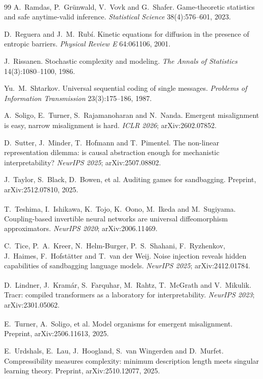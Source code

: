 \documentclass[11pt,a4paper]{article}
\newcommand{\unv}{\textsuperscript{\dag}}
\begin{document}
\begin{thebibliography}{99}
\unv{} A.~Ramdas, P.~Gr\"unwald, V.~Vovk and G.~Shafer.
Game-theoretic statistics and safe anytime-valid inference.
\emph{Statistical Science} 38(4):576--601, 2023.

 D.~Reguera and J.~M.~Rub\'i. Kinetic equations for
diffusion in the presence of entropic barriers. \emph{Physical Review E}
64:061106, 2001.

 J.~Rissanen. Stochastic complexity and modeling.
\emph{The Annals of Statistics} 14(3):1080--1100, 1986.

 Yu.~M.~Shtarkov. Universal sequential coding of
single messages. \emph{Problems of Information Transmission}
23(3):175--186, 1987.

 A.~Soligo, E.~Turner, S.~Rajamanoharan and N.~Nanda.
Emergent misalignment is easy, narrow misalignment is hard. \emph{ICLR
2026}; arXiv:2602.07852.

 D.~Sutter, J.~Minder, T.~Hofmann and T.~Pimentel. The
non-linear representation dilemma: is causal abstraction enough for
mechanistic interpretability? \emph{NeurIPS 2025}; arXiv:2507.08802.

 J.~Taylor, S.~Black, D.~Bowen, et al. Auditing games
for sandbagging. Preprint, arXiv:2512.07810, 2025.

\unv{} T.~Teshima, I.~Ishikawa, K.~Tojo, K.~Oono,
M.~Ikeda and M.~Sugiyama. Coupling-based invertible neural networks are
universal diffeomorphism approximators. \emph{NeurIPS 2020};
arXiv:2006.11469.

 C.~Tice, P.~A.~Kreer, N.~Helm-Burger, P.~S.~Shahani,
F.~Ryzhenkov, J.~Haimes, F.~Hofst\"atter and T.~van der Weij. Noise
injection reveals hidden capabilities of sandbagging language models.
\emph{NeurIPS 2025}; arXiv:2412.01784.

\unv{} D.~Lindner, J.~Kram\'ar, S.~Farquhar, M.~Rahtz,
T.~McGrath and V.~Mikulik. Tracr: compiled transformers as a laboratory
for interpretability. \emph{NeurIPS 2023}; arXiv:2301.05062.

\unv{} E.~Turner, A.~Soligo, et al. Model organisms
for emergent misalignment. Preprint, arXiv:2506.11613, 2025.

 E.~Urdshals, E.~Lau, J.~Hoogland, S.~van Wingerden
and D.~Murfet. Compressibility measures complexity: minimum description
length meets singular learning theory. Preprint, arXiv:2510.12077, 2025.


\end{thebibliography}
\end{document}

